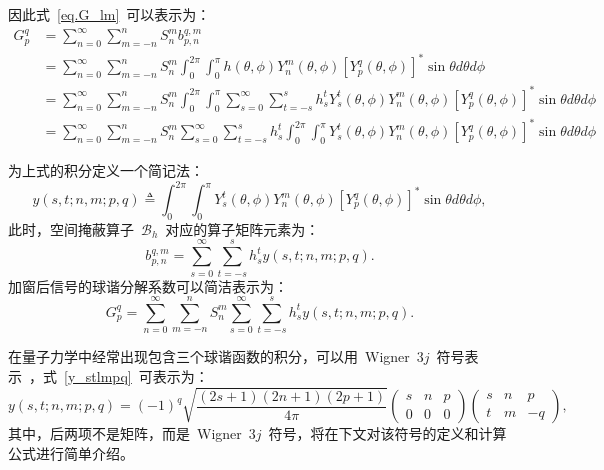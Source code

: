 因此式~\eqref{eq.G_lm}~可以表示为：
\begin{align}
G_{p}^{q} &= \sum_{n=0}^{\infty}\sum_{m=-n}^{n} S_{n}^{m} b_{p,n}^{q,m} \nonumber \\
& = \sum_{n=0}^{\infty}\sum_{m=-n}^{n}  S_{n}^{m}\int_{0}^{2\pi}\int _{0}^{\pi} h(\theta,\phi)Y_{n}^{m}(\theta,\phi) \left[Y_{p}^{q}(\theta,\phi) \right]^{*}\sin\theta d\theta d\phi \nonumber \\
& = \sum_{n=0}^{\infty}\sum_{m=-n}^{n}  S_{n}^{m}\int_{0}^{2\pi}\int _{0}^{\pi} \sum_{s=0}^{\infty} \sum_{t=-s}^{s} h_{s}^{t} Y_{s}^{t}(\theta,\phi) Y_{n}^{m}(\theta,\phi) \left[Y_{p}^{q}(\theta,\phi) \right]^{*}\sin\theta d\theta d\phi \nonumber \\
& = \sum_{n=0}^{\infty}\sum_{m=-n}^{n} S_{n}^{m}\sum_{s=0}^{\infty} \sum_{t=-s}^{s} h_{s}^{t}\int_{0}^{2\pi}\int _{0}^{\pi}Y_{s}^{t}(\theta,\phi) Y_{n}^{m}(\theta,\phi) \left[Y_{p}^{q}(\theta,\phi) \right]^{*}\sin\theta d\theta d\phi
\end{align}

为上式的积分定义一个简记法：
\begin{equation}\label{y_stlmpq}
y(s,t;n,m;p,q) \triangleq \int_{0}^{2\pi}\int _{0}^{\pi}Y_{s}^{t}(\theta,\phi) Y_{n}^{m}(\theta,\phi) \left[Y_{p}^{q}(\theta,\phi) \right]^{*}\sin\theta d\theta d\phi,
\end{equation}
此时，空间掩蔽算子~$\mathcal{B}_{h}$~对应的算子矩阵元素为：
\begin{equation}
b_{p,n}^{q,m} = \sum_{s=0}^{\infty} \sum_{t=-s}^{s} h_{s}^{t} y(s,t;n,m;p,q).
\end{equation}
加窗后信号的球谐分解系数可以简洁表示为：
\begin{equation}\label{eq.AddWindow_infty}
G_{p}^{q} = \sum_{n=0}^{\infty} \sum_{m=-n}^{n} S_{n}^{m}\sum_{s=0}^{\infty} \sum_{t=-s}^{s} h_{s}^{t}y(s,t;n,m;p,q).
\end{equation}

在量子力学中经常出现包含三个球谐函数的积分，可以用~Wigner~$3j$~符号表示~，式~\eqref{y_stlmpq}~可表示为：
\begin{equation}
y(s,t;n,m;p,q) = (-1)^{q} \sqrt{\frac{(2 s+1)(2 n+1)(2 p+1)}{4 \pi}}\left(\begin{array}{ccc}
s & n & p \\
0 & 0 & 0
\end{array}\right)\left(\begin{array}{ccc}
s & n & p \\
t & m & -q
\end{array}\right),
\end{equation}
其中，后两项不是矩阵，而是~Wigner~$3j$~符号，将在下文对该符号的定义和计算公式进行简单介绍。


